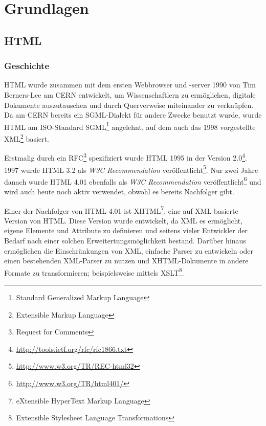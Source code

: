 \chapter{Grundlagen}

\section{HTML}

\subsection{Geschichte}
HTML wurde zusammen mit dem ersten Webbrowser und -server 1990 von Tim Berners-Lee am CERN
entwickelt, um Wissenschaftlern zu ermöglichen, digitale Dokumente auszutauschen und durch
Querverweise miteinander zu verknüpfen. Da am CERN bereits ein SGML-Dialekt für andere Zwecke
benutzt wurde, wurde HTML am ISO-Standard SGML\footnote{Standard Generalized Markup Language}
angelehnt, auf dem auch das 1998 vorgestellte XML\footnote{Extensible Markup Language} basiert.

Erstmalig durch ein RFC\footnote{Request for Comments} spezifiziert wurde HTML 1995 in der Version
2.0\footnote{\href{http://tools.ietf.org/rfc/rfc1866.txt}{http://tools.ietf.org/rfc/rfc1866.txt}}.
1997 wurde HTML 3.2 als \emph{W3C Recommendation}
veröffentlicht\footnote{\href{http://www.w3.org/TR/REC-html32}{http://www.w3.org/TR/REC-html32}}.
Nur zwei Jahre danach wurde HTML 4.01 ebenfalls als \emph{W3C Recommendation}
veröffentlicht\footnote{\href{http://www.w3.org/TR/html401/}{http://www.w3.org/TR/html401/}} und
wird auch heute noch aktiv verwendet, obwohl es bereits Nachfolger gibt.

Einer der Nachfolger von HTML 4.01 ist XHTML\footnote{eXtensible HyperText Markup Language}, eine
auf XML basierte Version von HTML. Diese Version wurde entwickelt, da XML es ermöglicht, eigene
Elemente und Attribute zu definieren und seitens vieler Entwickler der Bedarf nach einer solchen
Erweitertungsmöglichkeit bestand. Darüber hinaus ermöglichen die Einschränkungen von XML, einfache
Parser zu entwickeln oder einen bestehenden XML-Parser zu nutzen und XHTML-Dokumente in andere
Formate zu transformieren; beispielsweise mittels XSLT\footnote{Extensible Stylesheet Language
Transformations}. \citep{w3c:xhtml}

